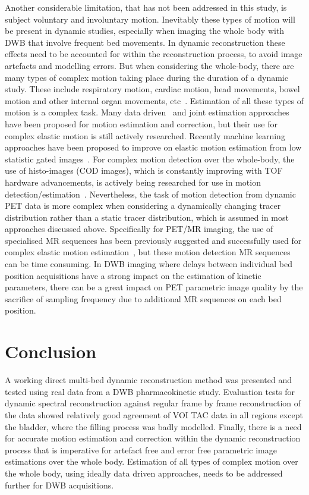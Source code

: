 Another considerable limitation, that has not been addressed in this study, is subject voluntary and involuntary motion. Inevitably these types of motion will be present in dynamic studies, especially when imaging the whole body with DWB that involve frequent bed movements. In dynamic reconstruction these effects need to be accounted for within the reconstruction process, to avoid image artefacts and modelling errors.
But when considering the whole-body, there are many types of complex motion taking place during the duration of a dynamic study. These include respiratory motion, cardiac motion, head movements, bowel motion and other internal organ movements, etc~\cite{Gallezot2019}. Estimation of all these types of motion is a complex task. Many data driven~\cite{Schleyer2015,Kesner2019,Lu2020} and joint estimation approaches~\cite{Bousse2017,Jiao2017} have been proposed for motion estimation and correction, but their use for complex elastic motion is still actively researched. Recently machine learning approaches have been proposed to improve on elastic motion estimation from low statistic gated images~\cite{Zhou2020,Zhou2021}. For complex motion detection over the whole-body, the use of histo-images (COD images), which is constantly improving with TOF hardware advancements, is actively being researched for use in motion detection/estimation~\cite{Panin1551}. 
Nevertheless, the task of motion detection from dynamic PET data is more complex when considering a dynamically changing tracer distribution rather than a static tracer distribution, which is assumed in most approaches discussed above.
Specifically for PET/MR imaging, the use of specialised MR sequences has been previously suggested and successfully used for complex elastic motion estimation~\cite{Tsoumpas2010,Catana2015}, but these motion detection MR sequences can be time consuming. In DWB imaging where delays between individual bed position acquisitions have a strong impact on the estimation of kinetic parameters, there can be a great impact on PET parametric image quality by the sacrifice of sampling frequency due to additional MR sequences on each bed position. 

\section{Conclusion}
A working direct multi-bed dynamic reconstruction method was presented and tested using real data from a DWB pharmacokinetic study. Evaluation tests for dynamic spectral reconstruction against regular frame by frame reconstruction of the data showed relatively good agreement of VOI TAC data in all regions except the bladder, where the filling process was badly modelled. 
Finally, there is a need for accurate motion estimation and correction within the dynamic reconstruction process that is imperative for artefact free and error free parametric image estimations over the whole body.
Estimation of all types of complex motion over the whole body, using ideally data driven approaches, needs to be addressed further for DWB acquisitions.
